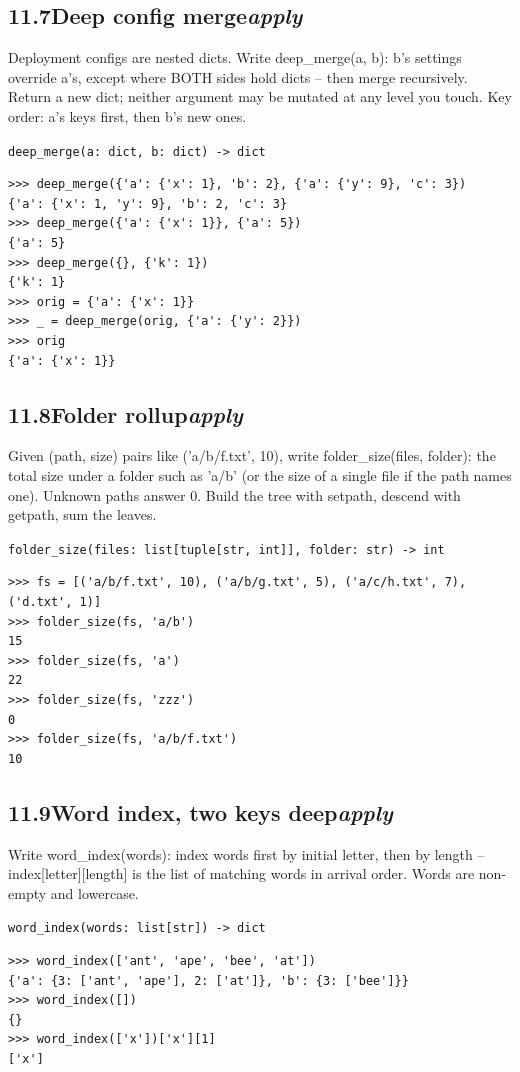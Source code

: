 \documentclass[10pt,letterpaper]{book}
\begin{document}
\subsection*{11.7\quad Deep config merge\hfill\textnormal{\textit{apply}}}
Deployment configs are nested dicts. Write deep\_merge(a, b): b's settings override a's, except where BOTH sides hold dicts -- then merge recursively. Return a new dict; neither argument may be mutated at any level you touch. Key order: a's keys first, then b's new ones.

\noindent\texttt{deep\_merge(a: dict, b: dict) -> dict}
\begin{lstlisting}[style=ex]
>>> deep_merge({'a': {'x': 1}, 'b': 2}, {'a': {'y': 9}, 'c': 3})
{'a': {'x': 1, 'y': 9}, 'b': 2, 'c': 3}
>>> deep_merge({'a': {'x': 1}}, {'a': 5})
{'a': 5}
>>> deep_merge({}, {'k': 1})
{'k': 1}
>>> orig = {'a': {'x': 1}}
>>> _ = deep_merge(orig, {'a': {'y': 2}})
>>> orig
{'a': {'x': 1}}
\end{lstlisting}
\subsection*{11.8\quad Folder rollup\hfill\textnormal{\textit{apply}}}
Given (path, size) pairs like ('a/b/f.txt', 10), write folder\_size(files, folder): the total size under a folder such as 'a/b' (or the size of a single file if the path names one). Unknown paths answer 0. Build the tree with setpath, descend with getpath, sum the leaves.

\noindent\texttt{folder\_size(files: list[tuple[str, int]], folder: str) -> int}
\begin{lstlisting}[style=ex]
>>> fs = [('a/b/f.txt', 10), ('a/b/g.txt', 5), ('a/c/h.txt', 7), ('d.txt', 1)]
>>> folder_size(fs, 'a/b')
15
>>> folder_size(fs, 'a')
22
>>> folder_size(fs, 'zzz')
0
>>> folder_size(fs, 'a/b/f.txt')
10
\end{lstlisting}
\subsection*{11.9\quad Word index, two keys deep\hfill\textnormal{\textit{apply}}}
Write word\_index(words): index words first by initial letter, then by length -- index[letter][length] is the list of matching words in arrival order. Words are non-empty and lowercase.

\noindent\texttt{word\_index(words: list[str]) -> dict}
\begin{lstlisting}[style=ex]
>>> word_index(['ant', 'ape', 'bee', 'at'])
{'a': {3: ['ant', 'ape'], 2: ['at']}, 'b': {3: ['bee']}}
>>> word_index([])
{}
>>> word_index(['x'])['x'][1]
['x']
\end{lstlisting}
\end{document}
